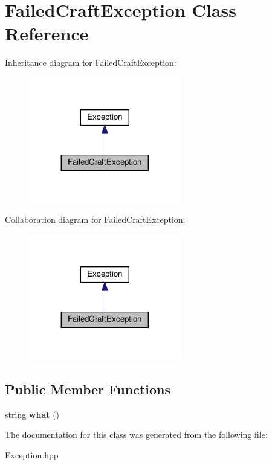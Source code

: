 \hypertarget{classFailedCraftException}{}\section{Failed\+Craft\+Exception Class Reference}
\label{classFailedCraftException}


Inheritance diagram for Failed\+Craft\+Exception\+:
\nopagebreak
\begin{figure}[H]
\begin{center}
\leavevmode
\includegraphics[width=188pt]{classFailedCraftException__inherit__graph}
\end{center}
\end{figure}


Collaboration diagram for Failed\+Craft\+Exception\+:
\nopagebreak
\begin{figure}[H]
\begin{center}
\leavevmode
\includegraphics[width=188pt]{classFailedCraftException__coll__graph}
\end{center}
\end{figure}
\subsection*{Public Member Functions}
\begin{DoxyCompactItemize}
\item 
\mbox{\label{classFailedCraftException_a520c879bea5c8800089629219861cc63}} 
string {\bfseries what} ()
\end{DoxyCompactItemize}


The documentation for this class was generated from the following file\+:\begin{DoxyCompactItemize}
\item 
Exception.\+hpp\end{DoxyCompactItemize}
